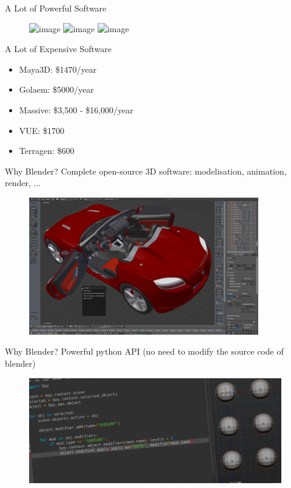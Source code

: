 \documentclass{beamer}
\begin{document}
\begin{frame}{A Lot of Powerful Software}


\begin{figure}
  \includegraphics<1>[width=.95\textwidth]{golaem.jpg}
  \includegraphics<2>[width=.95\textwidth]{massive.jpg}
  \includegraphics<3>[width=.95\textwidth]{VUE.png}\\
\end{figure}

\end{frame}

\begin{frame}{A Lot of Expensive Software}
  \begin{itemize}
    \item Maya3D: \$1470/year
    \item Golaem: \$5000/year
    \item Massive: \$3,500 - \$16,000/year
    \item VUE: \$1700
    \item Terragen: \$600
  \end{itemize}
\end{frame}

\begin{frame}{Why Blender?}
  Complete open-source 3D software: modelisation, animation, render, ...
    \begin{figure}
        \includegraphics[width=10cm]{blender_mod}
    \end{figure}
\end{frame}

\begin{frame}{Why Blender?}
  Powerful python API (no need to modify the source code of blender)
  \begin{figure}
        \includegraphics[width=11cm]{blender_script}
    \end{figure}
\end{frame}
\end{document}
